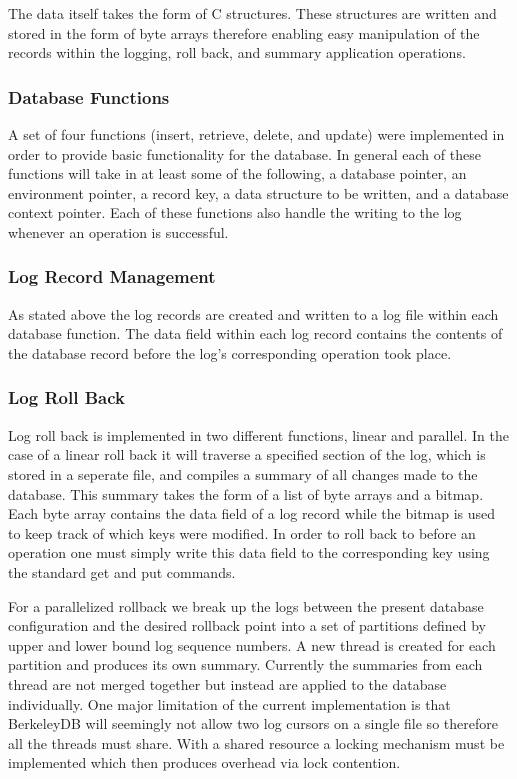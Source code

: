 \documentclass{article}
\begin{document}
The data itself takes the form of C structures. These structures are written and stored in the form of byte arrays therefore enabling easy manipulation of the records within the logging, roll back, and summary application operations.


\subsubsection{Database Functions}
A set of four functions (insert, retrieve, delete, and update) were implemented in order to provide basic functionality for the database. In general each of these functions will take in at least some of the following, a database pointer, an environment pointer, a record key, a data structure to be written, and a database context pointer. Each of these functions also handle the writing to the log whenever an operation is successful.

\subsubsection{Log Record Management}
As stated above the log records are created and written to a log file within each database function. The data field within each log record contains the contents of the database record before the log's corresponding operation took place. 

\subsubsection{Log Roll Back}

Log roll back is implemented in two different functions, linear and parallel. 
In the case of a linear roll back it will traverse a specified section of the log, which is stored in a seperate file, and compiles a summary of 
all changes made to the database. This summary takes the form of a list of byte arrays and a bitmap. 
Each byte array contains the data field of a log record while the bitmap is used to keep track of which keys were modified. In order to roll back to before an operation one must simply write this data field to the corresponding key using the standard get and put commands.

For a parallelized rollback we break up the logs between the present database configuration and the desired rollback point into a set of partitions defined by upper and lower bound log sequence numbers. 
A new thread is created for each partition and produces its own summary. Currently the summaries from each thread are not merged together but instead are applied to the database individually. One major limitation of the current implementation is that BerkeleyDB will seemingly not allow two log cursors on a single file so therefore all the threads must share. With a shared resource a locking mechanism must be implemented which then produces overhead via lock contention.
\end{document}
